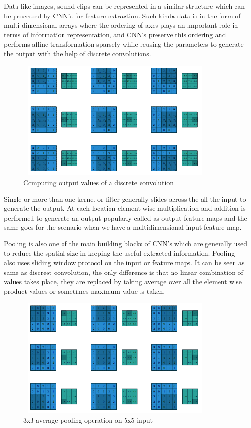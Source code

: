     Data like images, sound clips can be represented in a similar structure which can be processed by CNN's for feature extraction. Such kinda data is in the form of multi-dimensional arrays where the ordering of axes plays an important role in terms of information representation, and CNN's preserve this ordering and performs affine transformation sparsely while reusing the parameters to generate the output with the help of discrete convolutions. 
     \begin{figure}[h]
    \centering
    \includegraphics[width=10cm, height =6cm]{images/discrete_cnn.png}
    \caption{Computing output values of a discrete convolution \cite{https://doi.org/10.48550/arxiv.1603.07285}}
    \end{figure}
    
    Single or more than one kernel or filter generally slides across the all the input to generate the output. At each location element wise multiplication and addition is performed to generate an output popularly called as output feature maps and the same goes for the scenario when we have a multidimensional input feature map. 
    
    Pooling is also one of the main building blocks of CNN's which are generally used to reduce the spatial size in keeping the useful extracted information. Pooling also uses sliding window protocol on the input or feature maps. It can be seen as same as discreet convolution, the only difference is that no linear combination of values takes place, they are replaced by taking average over all the element wise product values or sometimes maximum value is taken. 
    \begin{figure}[h]
    \centering
    \includegraphics[width=10cm, height =6cm]{images/pooling_cnn.png}
    \caption{3x3 average pooling operation on 5x5 input \cite{https://doi.org/10.48550/arxiv.1603.07285}}
    \end{figure}
    
